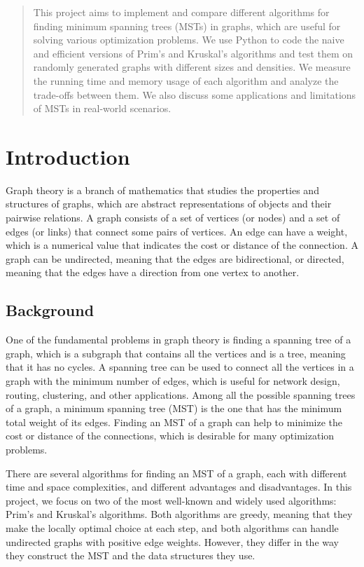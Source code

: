 \documentclass[a4paper, 10pt, twocolumn]{article}
\begin{document}
\begin{titlepage}
\onecolumn
\begin{abstract}
This project aims to implement and compare different algorithms for finding minimum spanning trees (MSTs) in graphs, which are useful for solving various optimization problems. We use Python to code the naive and efficient versions of Prim’s and Kruskal’s algorithms and test them on randomly generated graphs with different sizes and densities. We measure the running time and memory usage of each algorithm and analyze the trade-offs between them. We also discuss some applications and limitations of MSTs in real-world scenarios.
\end{abstract}
\tableofcontents
\end{titlepage}

\twocolumn
\section{Introduction}
Graph theory is a branch of mathematics that studies the properties and structures of graphs, which are abstract representations of objects and their pairwise relations. A graph consists of a set of vertices (or nodes) and a set of edges (or links) that connect some pairs of vertices. An edge can have a weight, which is a numerical value that indicates the cost or distance of the connection. A graph can be undirected, meaning that the edges are bidirectional, or directed, meaning that the edges have a direction from one vertex to another.

\subsection{Background}
One of the fundamental problems in graph theory is finding a spanning tree of a graph, which is a subgraph that contains all the vertices and is a tree, meaning that it has no cycles. A spanning tree can be used to connect all the vertices in a graph with the minimum number of edges, which is useful for network design, routing, clustering, and other applications. Among all the possible spanning trees of a graph, a minimum spanning tree (MST) is the one that has the minimum total weight of its edges. Finding an MST of a graph can help to minimize the cost or distance of the connections, which is desirable for many optimization problems.

There are several algorithms for finding an MST of a graph, each with different time and space complexities, and different advantages and disadvantages. In this project, we focus on two of the most well-known and widely used algorithms: Prim’s and Kruskal’s algorithms. Both algorithms are greedy, meaning that they make the locally optimal choice at each step, and both algorithms can handle undirected graphs with positive edge weights. However, they differ in the way they construct the MST and the data structures they use.
\end{document}
